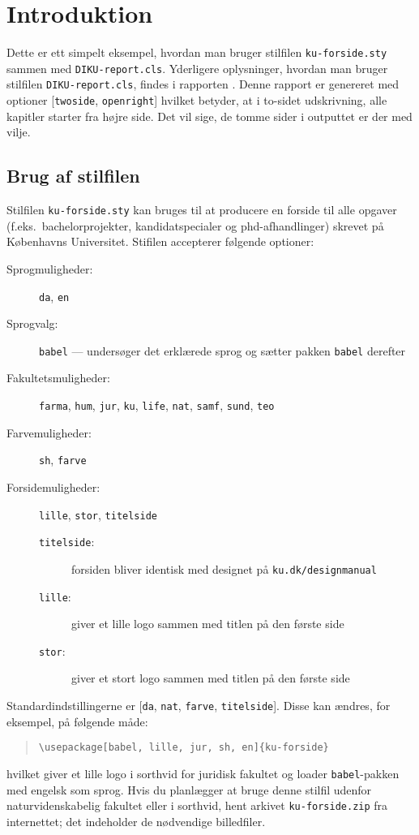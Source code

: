 \chapter*{Introduktion}
%

Dette er ett simpelt eksempel, hvordan man bruger stilfilen
\verb|ku-forside.sty| sammen med \verb|DIKU-report.cls|.  Yderligere
oplysninger, hvordan man bruger stilfilen \verb|DIKU-report.cls|,
findes i rapporten \cite{KR14}. Denne rapport er genereret med
optioner [\verb|twoside|, \verb|openright|] hvilket betyder, at i
to-sidet udskrivning, alle kapitler starter fra højre side. Det vil
sige, de tomme sider i outputtet er der med vilje.

\section*{Brug af stilfilen}

Stilfilen \verb|ku-forside.sty| kan bruges til at producere en forside
til alle opgaver (f.eks.~bachelorprojekter, kandidatspecialer og
phd-afhandlinger) skrevet på Københavns Universitet.  Stifilen
accepterer følgende optioner:
\begin{description}
\item[Sprogmuligheder:]  \texttt{da}, \texttt{en}
\item[Sprogvalg:] \verb|babel| --- undersøger det erklærede sprog og sætter pakken \verb|babel| derefter
\item[Fakultetsmuligheder:] \verb|farma|, \verb|hum|, \verb|jur|, \verb|ku|, \verb|life|, \verb|nat|, \verb|samf|, \verb|sund|, \verb|teo|
\item[Farvemuligheder:] \verb|sh|,  \verb|farve|
\item[Forsidemuligheder:] \verb|lille|, \verb|stor|, \verb|titelside|
\begin{description}
\item[\texttt{titelside}:] forsiden bliver identisk med designet på
  \texttt{ku.dk/designmanual}
\item[\texttt{lille}:] giver et lille logo sammen med titlen på den første side
\item[\texttt{stor}:] giver et stort logo sammen med titlen på den første side
\end{description}
\end{description}

Standardindstillingerne er [\verb|da|, \verb|nat|, \verb|farve|,
  \verb|titelside|].  Disse kan ændres, for eksempel, på følgende
måde:
\begin{quotation}
\verb|\usepackage[babel, lille, jur, sh, en]{ku-forside}|
\end{quotation}
hvilket giver et lille logo i sorthvid for juridisk fakultet og loader
\verb|babel|-pakken med engelsk som sprog.  Hvis du planlægger at bruge denne
stilfil udenfor naturvidenskabelig fakultet eller i sorthvid, hent
arkivet \verb|ku-forside.zip| fra internettet; det indeholder de
nødvendige billedfiler.
